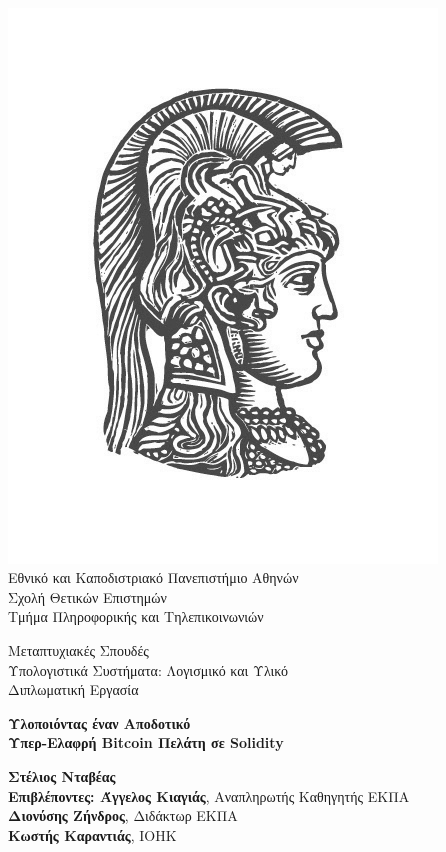 \
\vspace{1.5cm}

\begin{center}
    \includegraphics[scale=0.8]{figures/logo_uoa.jpg}\\
    {\large Εθνικό και Καποδιστριακό Πανεπιστήμιο Αθηνών \\
    Σχολή Θετικών Επιστημών \\
    Τμήμα Πληροφορικής και Τηλεπικοινωνιών\\}
    \vspace{1cm}
    \begin{LARGE}
        Μεταπτυχιακές Σπουδές \\
        Υπολογιστικά Συστήματα: Λογισμικό και Υλικό\\
        \vspace{5mm}
        {Διπλωματική Εργασία}\\
        \vspace{0.8cm}
    \end{LARGE}
    {\textbf{\LARGE Υλοποιόντας έναν Αποδοτικό\\ Υπερ-Ελαφρή Bitcoin Πελάτη σε Solidity}}\\
    \vspace{1.5cm}


    \textbf{\large Στέλιος Νταβέας} \\
    \vspace{2.5cm}
    \textbf{\large Επιβλέποντες: Άγγελος Κιαγιάς}\large , Αναπληρωτής Καθηγητής ΕΚΠΑ\\
    \hspace{0.82cm}
    \textbf{\large Διονύσης Ζήνδρος}\large, Διδάκτωρ ΕΚΠΑ\\
    \hspace{-1.15cm}
    \textbf{\large Κωστής Καραντιάς}\large, IOHK

    \date{Αθήνα, \\ Ιούνιος 2020}
    \pagebreak
\end{center}
